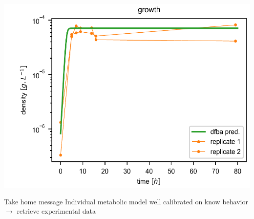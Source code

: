 \documentclass[8pt,usenames,dvipsnames]{beamer}
\begin{document}
\begin{frame}
\begin{minipage}{0.5\textwidth}
\end{minipage}
\begin{minipage}{0.5\textwidth}
\vspace{-0.3cm}
\includegraphics[width=\textwidth]{figures/validation-ll.pdf}
\end{minipage}%
\hspace{0.3cm}
\hfill
\begin{minipage}{0.4\textwidth}
\begin{block}{Take home message}
Individual metabolic model well calibrated on know behavior $\rightarrow$ retrieve experimental data
\end{block}

\end{minipage}

%
%
%
%
%
%
%


\end{frame}
\end{document}
